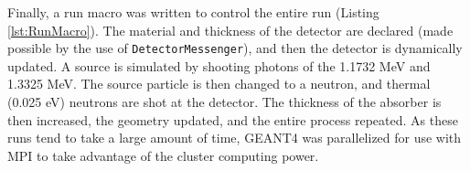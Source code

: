 Finally, a run macro was written to control the entire run (Listing \ref{lst:RunMacro}).
The material and thickness of the detector are declared (made possible by the use of \verb+DetectorMessenger+), and then the detector is dynamically updated.
A  source is simulated by shooting photons of the 1.1732 MeV and 1.3325 MeV.
The source particle is then changed to a neutron, and thermal (0.025 eV) neutrons are shot at the detector. 
The thickness of the absorber is then increased, the geometry updated, and the entire process repeated.
As these runs tend to take a large amount of time, GEANT4 was parallelized for use with MPI to take advantage of the cluster computing power.

